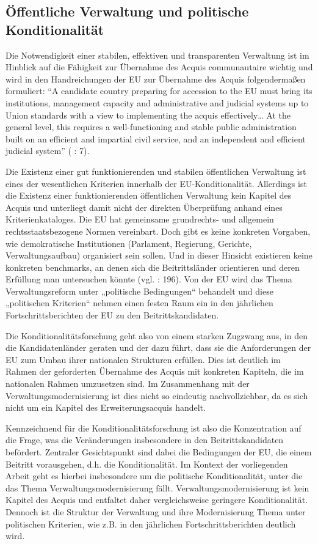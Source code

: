 \subsection{Öffentliche Verwaltung und politische Konditionalität}

Die Notwendigkeit einer stabilen, effektiven und transparenten Verwaltung ist im Hinblick auf die Fähigkeit zur Übernahme des Acquis communautaire wichtig und wird in den Handreichungen der EU zur Übernahme des Acquis folgendermaßen formuliert: “A candidate country preparing for accession to the EU must bring its institutions, management capacity and administrative and judicial systems up to Union standards with a view to implementing the acquis effectively… At the general level, this requires a well-functioning and stable public administration built on an efficient and impartial civil service, and an independent and efficient judicial system” (\cite{eurcom05} : 7).\par
Die Existenz einer gut funktionierenden und stabilen öffentlichen Verwaltung ist eines der wesentlichen Kriterien innerhalb der EU-Konditionalität. Allerdings ist die Existenz einer funktionierenden öffentlichen Verwaltung kein Kapitel des Acquis und unterliegt damit nicht der direkten Überprüfung anhand eines Kriterienkataloges. Die EU hat gemeinsame grundrechts- und allgemein rechtsstaatsbezogene Normen vereinbart. Doch gibt es keine konkreten Vorgaben, wie demokratische Institutionen (Parlament, Regierung, Gerichte, Verwaltungsaufbau) organisiert sein sollen. Und in dieser Hinsicht existieren keine konkreten benchmarks, an denen sich die Beitrittsländer orientieren und deren Erfüllung man untersuchen könnte (vgl. \cite{brusis09} : 196). Von der EU wird das Thema Verwaltungsreform unter „politische Bedingungen“ behandelt und diese „politischen Kriterien“ nehmen einen festen Raum ein in den jährlichen Fortschrittsberichten der EU zu den Beitrittskandidaten.\par
Die Konditionalitätsforschung geht also von einem starken Zugzwang aus, in den die Kandidatenländer geraten und der dazu führt, dass sie die Anforderungen der EU zum Umbau ihrer nationalen Strukturen erfüllen. Dies ist deutlich im Rahmen der geforderten Übernahme des Acquis mit konkreten Kapiteln, die im nationalen Rahmen umzusetzen sind. Im Zusammenhang mit der Verwaltungsmodernisierung ist dies nicht so eindeutig nachvollziehbar, da es sich nicht um ein Kapitel des Erweiterungsacquis handelt.\par
Kennzeichnend für die Konditionalitätsforschung ist also die Konzentration auf die Frage, was die Veränderungen insbesondere in den Beitrittskandidaten befördert. Zentraler Gesichtspunkt sind dabei die Bedingungen der EU, die einem Beitritt vorausgehen, d.h. die Konditionalität. Im Kontext der vorliegenden Arbeit geht es hierbei insbesondere um die politische Konditionalität, unter die das Thema Verwaltungsmodernisierung fällt. Verwaltungsmodernisierung ist kein Kapitel des Acquis und entfaltet daher vergleichsweise geringere Konditionalität. Dennoch ist die Struktur der Verwaltung und ihre Modernisierung Thema unter politischen Kriterien, wie z.B. in den jährlichen Fortschrittsberichten deutlich wird.\par
